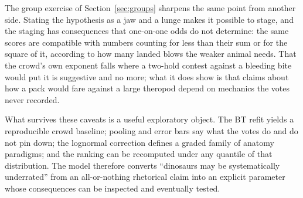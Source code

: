 \documentclass[11pt]{article}
\begin{document}
The group exercise of Section~\ref{sec:groups} sharpens the same point from another side. Stating the hypothesis as a jaw and a lunge makes it possible to stage, and the staging has consequences that one-on-one odds do not determine: the same scores are compatible with numbers counting for less than their sum or for the square of it, according to how many landed blows the weaker animal needs. That the crowd's own exponent falls where a two-hold contest against a bleeding bite would put it is suggestive and no more; what it does show is that claims about how a pack would fare against a large theropod depend on mechanics the votes never recorded.

What survives these caveats is a useful exploratory object. The BT refit yields a reproducible crowd baseline; pooling and error bars say what the votes do and do not pin down; the lognormal correction defines a graded family of anatomy paradigms; and the ranking can be recomputed under any quantile of that distribution. The model therefore converts ``dinosaurs may be systematically underrated'' from an all-or-nothing rhetorical claim into an explicit parameter whose consequences can be inspected and eventually tested.
\end{document}
